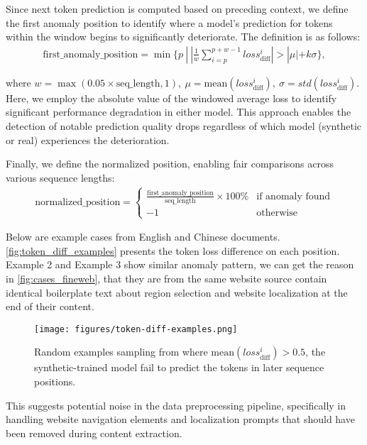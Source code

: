 Since next token prediction is computed based on preceding context, we define the first anomaly position to identify where a model's prediction for tokens within the window begins to significantly deteriorate. 
The definition is as follows:
\begin{align*}
\text{first\_anomaly\_position} = \min\{p ~|~ \left| \frac{1}{w}\sum_{i=p}^{p+w-1} loss^i_{\text{diff}}\right| > |\mu| + k\sigma\},
\end{align*}

where $w = \max(0.05 \times \text{seq\_length}, 1),~\mu = \text{mean}(loss^i_{\text{diff}}),~\sigma = std({loss^i_{\text{diff}}})$.
Here, we employ the absolute value of the windowed average loss to identify significant performance degradation in either model. 
This approach enables the detection of notable prediction quality drops regardless of which model (synthetic or real) experiences the deterioration.

Finally, we define the normalized position, enabling fair comparisons across various sequence lengths:
\begin{align*}
    \text{normalized\_position} = 
    \begin{cases} 
        \frac{\text{first\_anomaly\_position}}{\text{seq\_length}} \times 100\% & \text{if anomaly found} \\ 
        -1 & \text{otherwise} 
    \end{cases}
\end{align*}

Below are example cases from English and Chinese documents.
\autoref{fig:token_diff_examples} presents the token loss difference on each position.
Example 2 and Example 3 show similar anomaly pattern, we can get the reason in \autoref{fig:cases_fineweb},
that they are from the same website source contain identical boilerplate text about region selection and website localization at the end of their content.

\begin{figure*}[htb!]
    \centering
    \texttt{[image: figures/token-diff-examples.png]}
    \vspace{-2em}
    \caption{Random examples sampling from where $\text{mean}(loss^i_{\text{diff}})>0.5$, the synthetic-trained model fail to predict the tokens in later sequence positions.}
    \label{fig:token_diff_examples}
\end{figure*}

This suggests potential noise in the data preprocessing pipeline, 
specifically in handling website navigation elements and localization prompts 
that should have been removed during content extraction.

